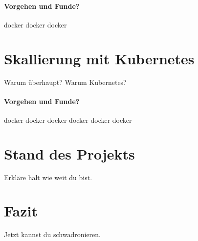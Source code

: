 \documentclass[12pt,a4paper]{article}
\begin{document}
\paragraph{Vorgehen und Funde?}
docker docker docker

\section{Skallierung mit \gls{Kubernetes}} \label{kubernetes}
Warum überhaupt? Warum Kubernetes?

\paragraph{Vorgehen und Funde?}
docker docker docker docker docker docker

\section{Stand des Projekts} \label{project_status}
Erkläre halt wie weit du bist.

\section{Fazit}\label{conclusion}
Jetzt kannst du schwadronieren.
\newpage


\printbibliography
\newpage
\printglossary
\end{document}
